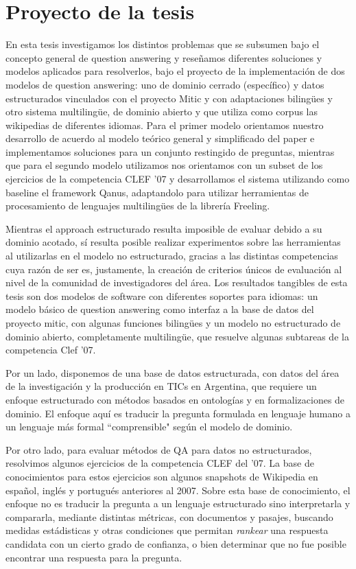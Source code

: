 \section{Proyecto de la tesis}
\horrible


En esta tesis investigamos los distintos problemas que se subsumen bajo el concepto general de question answering y reseñamos diferentes soluciones y modelos aplicados para resolverlos, bajo el proyecto de la implementación de dos modelos de question answering: uno de dominio cerrado (específico) y datos estructurados vinculados con el proyecto Mitic y con adaptaciones bilingües y otro sistema multilingüe, de dominio abierto y que utiliza como corpus las wikipedias de diferentes idiomas. Para el primer modelo orientamos nuestro desarrollo de acuerdo al modelo teórico general y simplificado del paper \cite{QADB1} e implementamos soluciones para un conjunto restingido de preguntas, mientras que para el segundo modelo utilizamos nos orientamos con un subset de los ejercicios de la competencia CLEF '07 y desarrollamos el sistema utilizando como baseline el framework Qanus, adaptandolo para utilizar herramientas de procesamiento de lenguajes multilingües de la librería Freeling. 

Mientras el approach estructurado resulta imposible de evaluar debido a su dominio acotado, sí resulta posible realizar experimentos sobre las herramientas al utilizarlas en el modelo no estructurado, gracias a las distintas competencias cuya razón de ser es, justamente, la creación de criterios únicos de evaluación al nivel de la comunidad de investigadores del área. Los resultados tangibles de esta tesis son dos modelos de software con diferentes soportes para idiomas: un modelo básico de question answering como interfaz a la base de datos del proyecto mitic, con algunas funciones bilingües y un modelo no estructurado de dominio abierto, completamente multilingüe, que resuelve algunas subtareas de la competencia Clef '07.


Por un lado, disponemos de una base de datos estructurada, con datos del área de la investigación y la
producción en TICs en Argentina, que requiere un enfoque estructurado con métodos basados en ontologías y en 
formalizaciones de dominio. El enfoque aquí es traducir la pregunta formulada en lenguaje humano a un lenguaje más
formal ``comprensible" según el modelo de dominio. 

Por otro lado, para evaluar métodos de QA 
para datos no estructurados, resolvimos algunos ejercicios de la competencia CLEF del '07. La base de conocimientos para
estos ejercicios son algunos snapshots de Wikipedia en español, inglés y portugués anteriores al 2007. Sobre esta base de conocimiento,
el enfoque no es traducir la pregunta a un lenguaje estructurado sino interpretarla y compararla, mediante distintas métricas, 
con documentos y pasajes, buscando medidas estádisticas y otras condiciones que permitan \textit{rankear} una respuesta candidata
con un cierto grado de confianza, o bien determinar que no fue posible encontrar una respuesta para la pregunta. 


